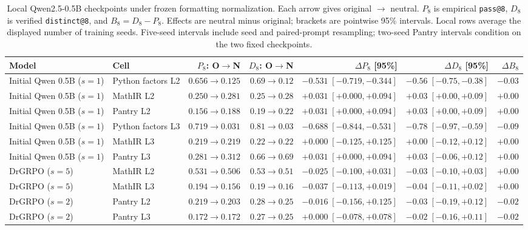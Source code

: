 \begin{table}[t]
\centering
\scriptsize
\setlength{\tabcolsep}{3pt}
\caption{Local Qwen2.5-0.5B checkpoints under frozen formatting normalization. Each arrow gives original $\to$ neutral. $P_8$ is empirical \texttt{pass@8}, $D_8$ is verified \texttt{distinct@8}, and $B_8=D_8-P_8$. Effects are neutral minus original; brackets are pointwise 95\% intervals. Local rows average the displayed number of training seeds. Five-seed intervals include seed and paired-prompt resampling; two-seed Pantry intervals condition on the two fixed checkpoints. }
\label{tab:prompt-hints-local-normalized-secondary}
\begin{tabular}{llrrrrr}
\toprule
Model & Cell & $P_8$: O$\to$N & $D_8$: O$\to$N & $\Delta P_8$ [95\%] & $\Delta D_8$ [95\%] & $\Delta B_8$ \\
\midrule
Initial Qwen 0.5B ($s=1$) & Python factors L2 & $0.656\to0.125$ & $0.69\to0.12$ & $-0.531\;[-0.719,-0.344]$ & $-0.56\;[-0.75,-0.38]$ & $-0.03$ \\
Initial Qwen 0.5B ($s=1$) & MathIR L2 & $0.250\to0.281$ & $0.25\to0.28$ & $+0.031\;[+0.000,+0.094]$ & $+0.03\;[+0.00,+0.09]$ & $+0.00$ \\
Initial Qwen 0.5B ($s=1$) & Pantry L2 & $0.156\to0.188$ & $0.19\to0.22$ & $+0.031\;[+0.000,+0.094]$ & $+0.03\;[+0.00,+0.09]$ & $+0.00$ \\
Initial Qwen 0.5B ($s=1$) & Python factors L3 & $0.719\to0.031$ & $0.81\to0.03$ & $-0.688\;[-0.844,-0.531]$ & $-0.78\;[-0.97,-0.59]$ & $-0.09$ \\
Initial Qwen 0.5B ($s=1$) & MathIR L3 & $0.219\to0.219$ & $0.22\to0.22$ & $+0.000\;[-0.125,+0.125]$ & $+0.00\;[-0.12,+0.12]$ & $+0.00$ \\
Initial Qwen 0.5B ($s=1$) & Pantry L3 & $0.281\to0.312$ & $0.66\to0.69$ & $+0.031\;[+0.000,+0.094]$ & $+0.03\;[-0.06,+0.12]$ & $+0.00$ \\
DrGRPO ($s=5$) & MathIR L2 & $0.531\to0.506$ & $0.53\to0.51$ & $-0.025\;[-0.100,+0.031]$ & $-0.03\;[-0.10,+0.03]$ & $+0.00$ \\
DrGRPO ($s=5$) & MathIR L3 & $0.194\to0.156$ & $0.19\to0.16$ & $-0.037\;[-0.113,+0.019]$ & $-0.04\;[-0.11,+0.02]$ & $+0.00$ \\
DrGRPO ($s=2$) & Pantry L2 & $0.219\to0.203$ & $0.28\to0.25$ & $-0.016\;[-0.156,+0.125]$ & $-0.03\;[-0.19,+0.12]$ & $-0.02$ \\
DrGRPO ($s=2$) & Pantry L3 & $0.172\to0.172$ & $0.27\to0.25$ & $+0.000\;[-0.078,+0.078]$ & $-0.02\;[-0.16,+0.11]$ & $-0.02$ \\

\end{tabular}
\end{table}
